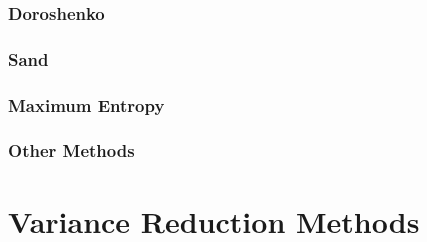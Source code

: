 




\subsubsection{Doroshenko}



\subsubsection{Sand}


\subsubsection{Maximum Entropy}



\subsubsection{Other Methods}


\section{Variance Reduction Methods}

